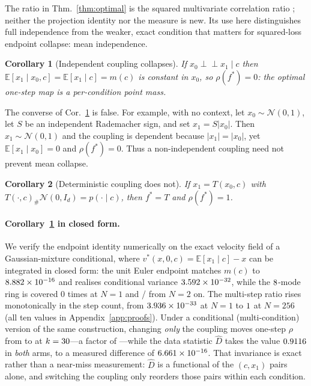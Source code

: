 \documentclass{article}
\theoremstyle{plain}
\newtheorem{cor}{Corollary}
\newcommand{\cD}{\hat D}
\newcommand{\Eop}{\mathbb{E}}
\newcommand{\Ncal}{\mathcal{N}}
\newcommand{\indep}{\perp\!\!\!\perp}
\begin{document}
The ratio in Thm.~\ref{thm:optimal} is the squared multivariate correlation ratio
\citep{renyi1959,sampson1984}; neither the projection identity nor the measure is new.
Its use here distinguishes full independence from the weaker, exact condition that
matters for squared-loss endpoint collapse: mean independence.

\begin{cor}[Independent coupling collapses]
\label{cor:indep}
If $x_0\indep x_1\mid c$ then $\Eop[x_1\mid x_0,c]=\Eop[x_1\mid c]=m(c)$ is
constant in $x_0$, so $\rho(f^\ast)=0$: the optimal one-step map is a per-condition
point mass.
\end{cor}

The converse of Cor.~\ref{cor:indep} is false. For example, with no context, let
$x_0\sim\Ncal(0,1)$, let $S$ be an independent Rademacher sign, and set
$x_1=S|x_0|$. Then $x_1\sim\Ncal(0,1)$ and the coupling is dependent because
$|x_1|=|x_0|$, yet $\Eop[x_1\mid x_0]=0$ and $\rho(f^\ast)=0$. Thus a
non-independent coupling need not prevent mean collapse.

\begin{cor}[Deterministic coupling does not]
\label{cor:det}
If $x_1=T(x_0,c)$ with $T(\cdot,c)_\#\Ncal(0,I_d)=p(\cdot\mid c)$, then
$f^\ast=T$ and $\rho(f^\ast)=1$.
\end{cor}

\paragraph{Corollary~\ref{cor:indep} in closed form.} We verify the endpoint identity
numerically on the exact velocity field of a Gaussian-mixture conditional, where
$v^\ast(x,0,c)=\Eop[x_1\mid c]-x$ can be integrated in closed form: the unit Euler
endpoint matches $m(c)$ to $8.882\times 10^{-16}$ and realises conditional variance
$3.592\times 10^{-32}$, while the $8$-mode ring is covered $0$ times at $N=1$ and
\MSCovTwo{}/\ImpK{} from $N=2$ on. The multi-step ratio rises monotonically in the step count, from $3.936\times 10^{-33}$ at $N=1$
to $1$ at $N=256$ (all ten values in Appendix~\ref{app:proofs}).
Under a conditional (multi-condition) version of the same
construction, changing \emph{only} the coupling moves one-step $\rho$ from
\CondRhoInd{} to \CondRhoDet{} at $k=30$---a factor of \CondContrast---while
the data statistic $\cD$ takes the value $0.9116$ in \emph{both} arms, to a
measured difference of $6.661\times 10^{-16}$. That invariance is exact rather than a near-miss
measurement: $\cD$ is a functional of the
$(c,x_1)$ pairs alone, and switching the coupling only reorders those pairs within each
condition.
\end{document}
